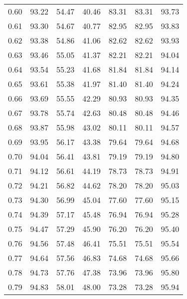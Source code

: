 \begin{tabular}{|c|c|c|c|c|c|c|}
      0.60 &     93.22 &     54.47 &      40.46 &   83.31 &      83.31 &         93.73 \\
      0.61 &     93.30 &     54.67 &      40.77 &   82.95 &      82.95 &         93.83 \\
      0.62 &     93.38 &     54.86 &      41.06 &   82.62 &      82.62 &         93.93 \\
      0.63 &     93.46 &     55.05 &      41.37 &   82.21 &      82.21 &         94.04 \\
      0.64 &     93.54 &     55.23 &      41.68 &   81.84 &      81.84 &         94.14 \\
      0.65 &     93.61 &     55.38 &      41.97 &   81.40 &      81.40 &         94.24 \\
      0.66 &     93.69 &     55.55 &      42.29 &   80.93 &      80.93 &         94.35 \\
      0.67 &     93.78 &     55.74 &      42.63 &   80.48 &      80.48 &         94.46 \\
      0.68 &     93.87 &     55.98 &      43.02 &   80.11 &      80.11 &         94.57 \\
      0.69 &     93.95 &     56.17 &      43.38 &   79.64 &      79.64 &         94.68 \\
      0.70 &     94.04 &     56.41 &      43.81 &   79.19 &      79.19 &         94.80 \\
      0.71 &     94.12 &     56.61 &      44.19 &   78.73 &      78.73 &         94.91 \\
      0.72 &     94.21 &     56.82 &      44.62 &   78.20 &      78.20 &         95.03 \\
      0.73 &     94.30 &     56.99 &      45.04 &   77.60 &      77.60 &         95.15 \\
      0.74 &     94.39 &     57.17 &      45.48 &   76.94 &      76.94 &         95.28 \\
      0.75 &     94.47 &     57.29 &      45.90 &   76.20 &      76.20 &         95.40 \\
      0.76 &     94.56 &     57.48 &      46.41 &   75.51 &      75.51 &         95.54 \\
      0.77 &     94.64 &     57.56 &      46.83 &   74.68 &      74.68 &         95.66 \\
      0.78 &     94.73 &     57.76 &      47.38 &   73.96 &      73.96 &         95.80 \\
      0.79 &     94.83 &     58.01 &      48.00 &   73.28 &      73.28 &         95.94 \\

\end{tabular}
